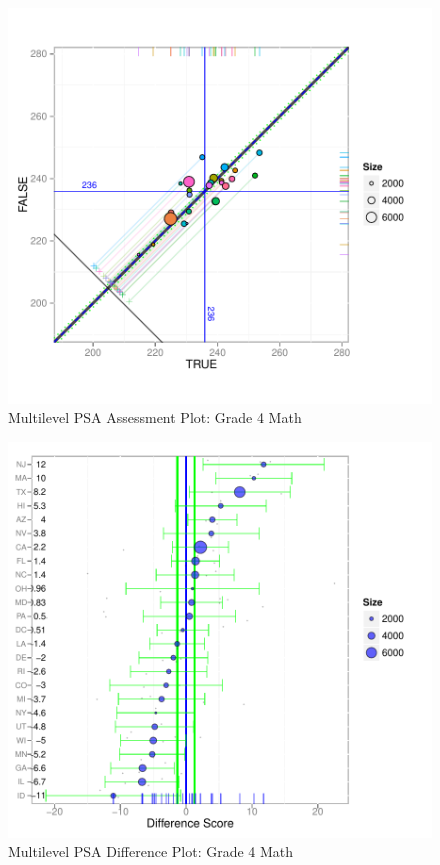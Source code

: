 \documentclass[letterpaper,12p,twoside]{article} %
\begin{document}
\begin{figure}[ht]
\begin{center}
\includegraphics[width=\textwidth]{../Figures2009/g4math-mlpsa-ctree.pdf}
\caption{Multilevel PSA Assessment Plot: Grade 4 Math}
\label{fig:g4math-mlpsa-ctree}
\end{center}
\end{figure}

\begin{figure}[ht]
\begin{center}
\includegraphics[width=\textwidth]{../Figures2009/g4math-mlpsa-ctree-diff.pdf}
\caption{Multilevel PSA Difference Plot: Grade 4 Math}
\label{fig:g4math-mlpsa-ctree-diff}
\end{center}
\end{figure}
\end{document}
